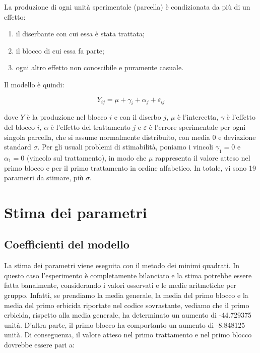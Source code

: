 \documentclass[a4paper,12pt,oneside]{book}
\providecommand{\tightlist}{%
  \setlength{\itemsep}{0pt}\setlength{\parskip}{0pt}}
\begin{document}
La produzione di ogni unità sperimentale (parcella) è condizionata da più di un effetto:

\begin{enumerate}
\def\labelenumi{\arabic{enumi}.}
\tightlist
\item
  il diserbante con cui essa è stata trattata;
\item
  il blocco di cui essa fa parte;
\item
  ogni altro effetto non conoscibile e puramente casuale.
\end{enumerate}

Il modello è quindi:

\[ Y_{ij} = \mu + \gamma_i + \alpha_j + \varepsilon_{ij}\]

dove \(Y\) è la produzione nel blocco \(i\) e con il diserbo \(j\), \(\mu\) è l'intercetta, \(\gamma\) è l'effetto del blocco \(i\), \(\alpha\) è l'effetto del trattamento \(j\) e \(\varepsilon\) è l'errore sperimentale per ogni singola parcella, che si assume normalmente distribuito, con media 0 e deviazione standard \(\sigma\). Per gli usuali problemi di stimabilità, poniamo i vincoli \(\gamma_1 = 0\) e \(\alpha_1 = 0\) (vincolo sul trattamento), in modo che \(\mu\) rappresenta il valore atteso nel primo blocco e per il primo trattamento in ordine alfabetico. In totale, vi sono 19 parametri da stimare, più \(\sigma\).

\hypertarget{stima-dei-parametri-1}{%
\section{Stima dei parametri}\label{stima-dei-parametri-1}}

\hypertarget{coefficienti-del-modello-1}{%
\subsection{Coefficienti del modello}\label{coefficienti-del-modello-1}}

La stima dei parametri viene eseguita con il metodo dei minimi quadrati. In questo caso l'esperimento è completamente bilanciato e la stima potrebbe essere fatta banalmente, considerando i valori osservati e le medie aritmetiche per gruppo. Infatti, se prendiamo la media generale, la media del primo blocco e la media del primo erbicida riportate nel codice sovrastante, vediamo che il primo erbicida, rispetto alla media generale, ha determinato un aumento di -44.729375 unità. D'altra parte, il primo blocco ha comportanto un aumento di -8.848125 unità. Di conseguenza, il valore atteso nel primo trattamento e nel primo blocco dovrebbe essere pari a:
\end{document}
